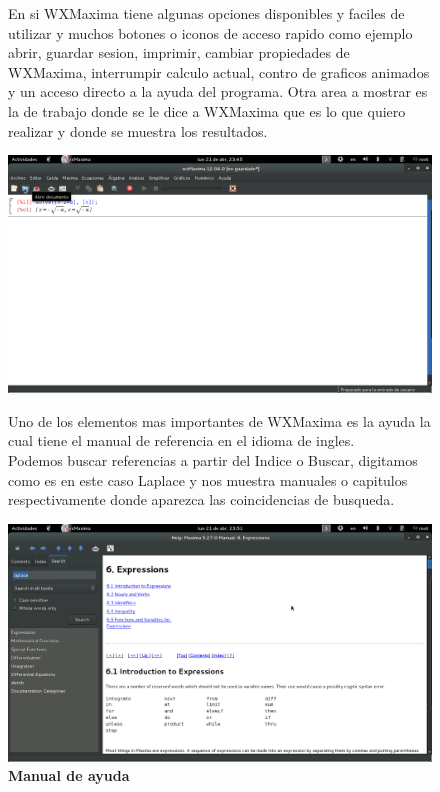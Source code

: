 \documentclass[10pt,a4paper]{book}
\begin{document}
\begin{small}
\begin{figure}[htb]
En si WXMaxima tiene algunas opciones disponibles y faciles de utilizar y muchos botones o iconos de acceso rapido como ejemplo abrir, guardar sesion, imprimir, cambiar propiedades de WXMaxima, interrumpir calculo actual, contro de graficos animados y un acceso directo a la ayuda del programa.
Otra area a mostrar es la de trabajo donde se le dice a WXMaxima que es lo que quiero realizar y donde se muestra los resultados.
\begin{center}
\includegraphics[width=13cm]{fotos/cap10.png}
\caption{\textbf{ }}
\end{center}
\end{figure}

\begin{figure}[htb]
Uno de los elementos mas importantes de WXMaxima es la ayuda la cual tiene el manual de referencia en el idioma de ingles.\\
Podemos buscar referencias a partir del Indice o Buscar, digitamos como es en este caso Laplace y nos muestra manuales o capitulos respectivamente donde aparezca las coincidencias de busqueda.
\begin{center}
\includegraphics[width=13cm]{fotos/cap11}
\caption{\textbf{Manual de ayuda}}
\end{center}
\end{figure}


\end{small}
\end{document}
